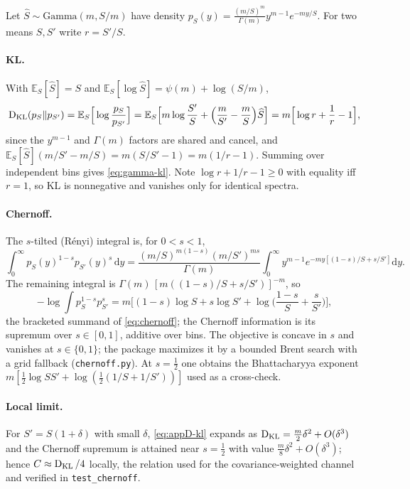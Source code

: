 \documentclass[11pt]{article}
\DeclareMathOperator{\KL}{D_{\rm KL}}
\newcommand{\E}{\mathbb{E}}
\newcommand{\dd}{\mathrm{d}}
\begin{document}
Let \(\widehat S\sim\mathrm{Gamma}(m,S/m)\) have density \(p_S(y)=\frac{(m/S)^m}{\Gamma(m)}y^{m-1}e^{-my/S}\). For two means \(S,S'\) write \(r=S'/S\).

\paragraph{KL.} With \(\E_S[\widehat S]=S\) and \(\E_S[\log\widehat S]=\psi(m)+\log(S/m)\),
\begin{equation}
\KL(p_S\Vert p_{S'})=\E_S\Big[\log\frac{p_S}{p_{S'}}\Big]
=\E_S\Big[m\log\frac{S'}{S}+\Big(\frac{m}{S'}-\frac{m}{S}\Big)\widehat S\Big]
=m\Big[\log r+\frac1r-1\Big],
\label{eq:appD-kl}
\end{equation}
since the \(y^{m-1}\) and \(\Gamma(m)\) factors are shared and cancel, and \(\E_S[\widehat S](m/S'-m/S)=m(S/S'-1)=m(1/r-1)\). Summing over independent bins gives \eqref{eq:gamma-kl}. Note \(\log r+1/r-1\ge0\) with equality iff \(r=1\), so KL is nonnegative and vanishes only for identical spectra.

\paragraph{Chernoff.} The \(s\)-tilted (R\'enyi) integral is, for \(0<s<1\),
\begin{equation}
\int_0^\infty p_S(y)^{1-s}p_{S'}(y)^{s}\,\dd y
=\frac{(m/S)^{m(1-s)}(m/S')^{ms}}{\Gamma(m)}\int_0^\infty y^{m-1}e^{-my[(1-s)/S+s/S']}\dd y.
\label{eq:appD-tilt}
\end{equation}
The remaining integral is \(\Gamma(m)\,[m((1-s)/S+s/S')]^{-m}\), so
\begin{equation}
-\log\!\int p_S^{1-s}p_{S'}^{s}
=m\Big[(1-s)\log S+s\log S'+\log\!\Big(\frac{1-s}{S}+\frac{s}{S'}\Big)\Big],
\label{eq:appD-cher}
\end{equation}
the bracketed summand of \eqref{eq:chernoff}; the Chernoff information is its supremum over \(s\in[0,1]\), additive over bins. The objective is concave in \(s\) and vanishes at \(s\in\{0,1\}\); the package maximizes it by a bounded Brent search with a grid fallback (\texttt{chernoff.py}). At \(s=\tfrac12\) one obtains the Bhattacharyya exponent \(m[\tfrac12\log SS'+\log(\tfrac12(1/S+1/S'))]\) used as a cross-check.

\paragraph{Local limit.} For \(S'=S(1+\delta)\) with small \(\delta\), \eqref{eq:appD-kl} expands as \(\KL=\tfrac{m}{2}\delta^2+O(\delta^3)\) and the Chernoff supremum is attained near \(s=\tfrac12\) with value \(\tfrac{m}{8}\delta^2+O(\delta^3)\); hence \(C\approx\KL/4\) locally, the relation used for the covariance-weighted channel and verified in \texttt{test\_chernoff}.
\end{document}
